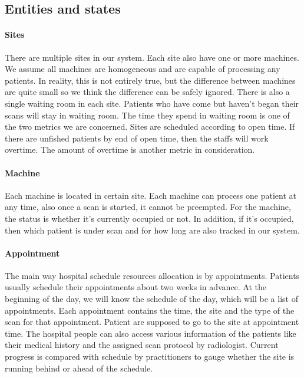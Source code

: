\subsection{Entities and states}

\paragraph{Sites} There are multiple sites in our system. Each site also have one or more machines. We assume all machines are homogeneous and are capable of processing any patients. In reality, this is not entirely true, but the difference between machines are quite small so we think the difference can be safely ignored. There is also a single waiting room in each site. Patients who have come but haven't began their scans will stay in waiting room. The time they spend in waiting room is one of the two metrics we are concerned. Sites are scheduled according to open time. If there are unfished patients by end of open time, then the staffs will work overtime. The amount of overtime is another metric in consideration.

\paragraph{Machine} Each machine is located in certain site. Each machine can process one patient at any time, also once a scan is started, it cannot be preempted. For the machine, the status is whether it's currently occupied or not. In addition, if it's occupied, then which patient is under scan and for how long are also tracked in our system.

\paragraph{Appointment} The main way hospital schedule resources allocation is by appointments. Patients usually schedule their appointments about two weeks in advance. At the beginning of the day, we will know the schedule of the day, which will be a list of appointments. Each appointment contains the time, the site and the type of the scan for that appointment. Patient are supposed to go to the site at appointment time. The hospital people can also access various information of the patients like their medical history and the assigned scan protocol by radiologist. Current progress is compared with schedule by practitioners to gauge whether the site is running behind or ahead of the schedule.

